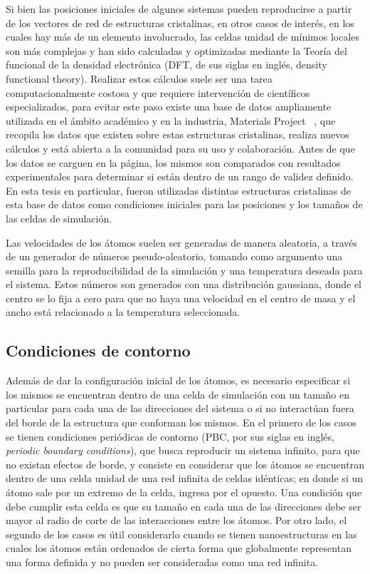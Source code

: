 Si bien las posiciones iniciales de algunos sistemas pueden reproducirse a partir
de los vectores de red de estructuras cristalinas, en otros casos de interés, en 
los cuales hay más de un elemento involucrado, las celdas unidad de mínimos 
locales son más complejas y han sido calculadas y optimizadas mediante la Teoría 
del funcional de la densidad electrónica (DFT, de sus siglas en inglés, density 
functional theory). Realizar estos cálculos suele ser una tarea
computacionalmente costosa y que requiere intervención de científicos 
especializados, para evitar este paso existe una base de datos ampliamente 
utilizada en el ámbito académico y en la industria, Materials Project 
~\cite{materials_project}, que recopila los datos que existen sobre estas 
estructuras cristalinas, realiza nuevos cálculos y está abierta a la comunidad 
para su uso y colaboración. Antes de que los datos se carguen en la página, los 
mismos son comparados con resultados experimentales para determinar si están 
dentro de un rango de validez definido. En esta tesis en particular, fueron 
utilizadas distintas estructuras cristalinas de esta base de datos como 
condiciones iniciales para las posiciones y los tamaños de las celdas de 
simulación.

Las velocidades de los átomos suelen ser generadas de manera aleatoria, a través
de un generador de números pseudo-aleatorio, tomando como argumento una semilla 
para la reproducibilidad de la simulación y una temperatura deseada para el
sistema. Estos números son generados con una distribución gaussiana, donde el 
centro se lo fija a cero para que no haya una velocidad en el centro de masa y 
el ancho está relacionado a la temperatura seleccionada.

\subsection{Condiciones de contorno}

Además de dar la configuración inicial de los átomos, es necesario especificar si
los mismos se encuentran dentro de una celda de simulación con un tamaño en
particular para cada una de las direcciones del sistema o si no interactúan fuera
del borde de la estructura que conforman los mismos. En el primero de los casos
se tienen condiciones periódicas de contorno (PBC, por sus siglas en inglés, 
\textit{periodic boundary conditions}), que busca reproducir un sistema infinito,
para que no existan efectos de borde, y consiste en considerar que los átomos se 
encuentran dentro de una celda unidad de una red infinita de celdas idénticas; en
donde si un átomo sale por un extremo de la celda, ingresa por el opuesto. Una
condición que debe cumplir esta celda es que su tamaño en cada una de las 
direcciones debe ser mayor al radio de corte de las interacciones entre los 
átomos. Por otro lado, el segundo de los casos es útil considerarlo cuando se 
tienen nanoestructuras en las cuales los átomos están ordenados de cierta forma 
que globalmente representan una forma definida y no pueden ser consideradas como
una red infinita.

